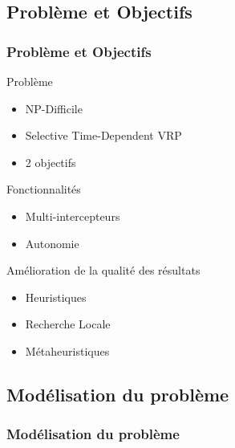 \subsection{Problème et Objectifs}
\begin{frame}
	\frametitle{Problème et Objectifs}
	\begin{block}{Problème}
		\begin{itemize}
			\item NP-Difficile
			\item Selective Time-Dependent VRP
			\item 2 objectifs
		\end{itemize}
	\end{block}
	\begin{exampleblock}{Fonctionnalités}
		\begin{itemize}
			\item Multi-intercepteurs
			\item Autonomie
		\end{itemize}
	\end{exampleblock}
	\begin{exampleblock}{Amélioration de la qualité des résultats}
		\begin{itemize}
			\item Heuristiques
			\item Recherche Locale
			\item Métaheuristiques
		\end{itemize}
	\end{exampleblock}
\end{frame}

\subsection{Modélisation du problème}
\begin{frame}
	\frametitle{Modélisation du problème}
	\begin{center}
		
	\end{center}
\end{frame}

